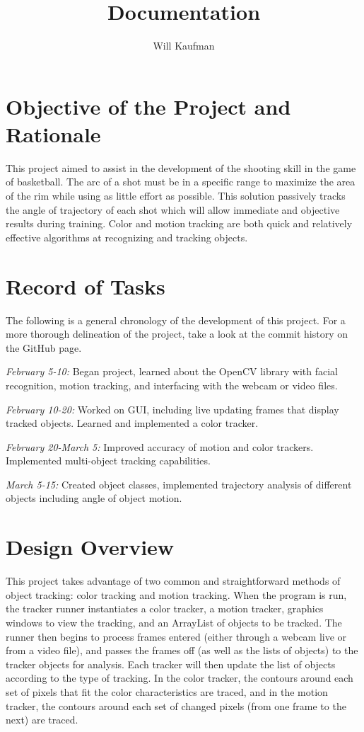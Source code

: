 \documentclass[11pt]{article}
\begin{document}
\title{Documentation}
\author{Will Kaufman}
\maketitle

\section{Objective of the Project and Rationale}
This project aimed to assist in the development of the shooting skill in the game of basketball.  The arc of a shot must be in a specific range to maximize the area of the rim while using as little effort as possible.  This solution passively tracks the angle of trajectory of each shot which will allow immediate and objective results during training.  Color and motion tracking are both quick and relatively effective algorithms at recognizing and tracking objects.

\section{Record of Tasks}
The following is a general chronology of the development of this project.  For a more thorough delineation of the project, take a look at the commit history on the GitHub page.

\emph{February 5-10:} Began project, learned about the OpenCV library with facial recognition, motion tracking, and interfacing with the webcam or video files.

\emph{February 10-20:} Worked on GUI, including live updating frames that display tracked objects.  Learned and implemented a color tracker.

\emph{February 20-March 5:} Improved accuracy of motion and color trackers.  Implemented multi-object tracking capabilities.

\emph{March 5-15:} Created object classes, implemented trajectory analysis of different objects including angle of object motion.

\section{Design Overview}
This project takes advantage of two common and straightforward methods of object tracking: color tracking and motion tracking.  When the program is run, the tracker runner instantiates a color tracker, a motion tracker, graphics windows to view the tracking, and an ArrayList of objects to be tracked.  The runner then begins to process frames entered (either through a webcam live or from a video file), and passes the frames off (as well as the lists of objects) to the tracker objects for analysis.  Each tracker will then update the list of objects according to the type of tracking.  In the color tracker, the contours around each set of pixels that fit the color characteristics are traced, and in the motion tracker, the contours around each set of changed pixels (from one frame to the next) are traced.
\end{document}
